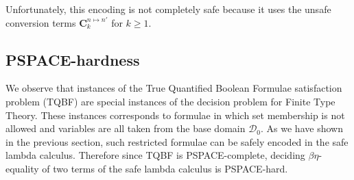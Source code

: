 Unfortunately, this encoding is not completely safe because it uses
the unsafe conversion terms $\mathbf{C}_k^{n\mapsto n'}$ for
$k\geq1$.



\subsection{PSPACE-hardness}
We observe that instances of the True Quantified Boolean Formulae
satisfaction problem (TQBF) are special instances of the decision
problem for Finite Type Theory. These instances corresponds to
formulae in which set membership is not allowed and variables are
all taken from the base domain $\mathcal{D}_0$. As we have shown in
the previous section, such restricted formulae can be safely encoded
in the safe lambda calculus. Therefore since TQBF is
PSPACE-complete, deciding $\beta\eta$-equality of two terms of the
safe lambda calculus is PSPACE-hard.

